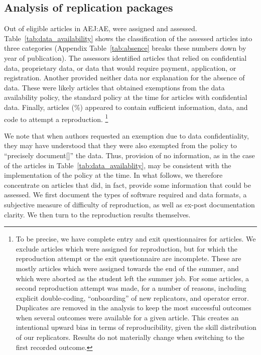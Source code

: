 
\subsection{Analysis of replication packages}


Out of   eligible articles in AEJ:AE,  were assigned and assessed. Table~\ref{tab:data_availability} shows the classification of the  assessed articles into three categories (Appendix Table~\ref{tab:absence} breaks these numbers down by year of publication). The assessors identified  articles that relied on confidential data, proprietary data, or data that would require payment, application, or registration. Another  provided neither data nor explanation for the absence of data. These were likely articles that obtained exemptions from the data availability policy, the standard policy at the time for articles with confidential data. Finally,  articles (\%) appeared to contain sufficient information, data, and code to attempt a reproduction.%
%
\footnote{To be precise, we have complete entry and exit questionnaires for  articles. We exclude articles which were assigned for reproduction, but for which the reproduction attempt or the exit questionnaire are incomplete. These are mostly articles which were assigned towards the end of the summer, and which were aborted as the student left the summer job.%
 For some  articles, a second reproduction attempt was made,  for a number of reasons, including explicit double-coding, ``onboarding'' of new replicators, and operator error. Duplicates are removed in the analysis to keep the most successful outcomes when several outcomes were available for a given article. This creates an intentional upward bias in terms of reproducibility, given the skill distribution of our replicators. Results do not materially change when switching to the first recorded outcome.}





We note that when authors requested an exemption due to data confidentiality, they may have understood that they were also exempted from the policy to ``precisely document[]'' the data. Thus, provision of no information, as in the case of the  articles in Table~\ref{tab:data_availablity}, may be consistent with the implementation of the policy at the time. In what follows, we therefore concentrate on articles that did, in fact, provide some information that could be assessed. We first document the types of software required and data formats, a subjective measure of difficulty of reproduction, as well as ex-post documentation clarity. We then turn to the reproduction results themselves.


